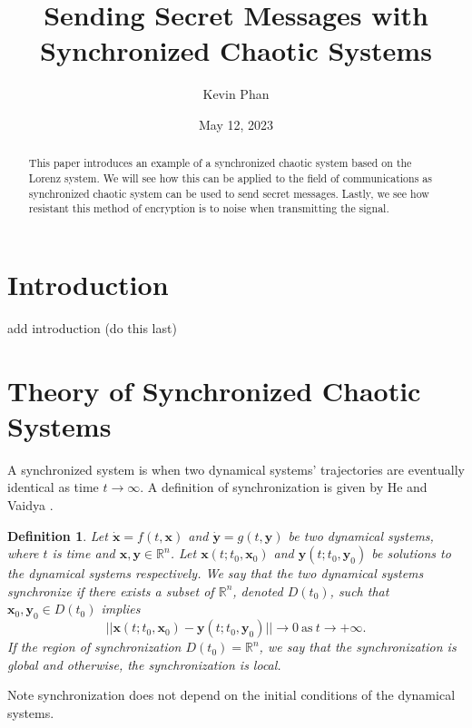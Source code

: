 \documentclass[12pt]{article}
\title{Sending Secret Messages with Synchronized Chaotic Systems}
\author{Kevin Phan}
\date{May 12, 2023}
\newtheorem{definition}{Definition}[section]
\begin{document}
    \maketitle

    \begin{abstract}
      This paper introduces an example of a synchronized chaotic system based on the Lorenz system. We will see how this can be applied to the field of communications as synchronized chaotic system can be used to send secret messages. Lastly, we see how resistant this method of encryption is to noise when transmitting the signal. 
    \end{abstract}

    \newpage

    \tableofcontents

    \newpage

    \section{Introduction}
      add introduction (do this last) \cite{cuomo1993}
    \section{Theory of Synchronized Chaotic Systems}
      A synchronized system is when two dynamical systems' trajectories are eventually identical as time $t \rightarrow \infty$. A definition of synchronization is given by He and Vaidya \cite{he_vaidya_1992}. 
      \begin{definition}
        Let $\dot{\mathbf{x}} = f(t,\mathbf{x})$ and $\dot{\mathbf{y}} = g(t,\mathbf{y})$ be two dynamical systems, where $t$ is time and $\mathbf{x},\mathbf{y} \in \mathbb{R}^n$. Let $\mathbf{x}(t;t_0,\mathbf{x}_0)$ and $\mathbf{y}(t;t_0,\mathbf{y}_0)$ be solutions to the dynamical systems respectively. We say that the two dynamical systems synchronize if there exists a subset of $\mathbb{R}^n$, denoted $D(t_0)$, such that $\mathbf{x}_0,\mathbf{y}_0 \in D(t_0)$ implies 
        \begin{equation*} 
          ||\mathbf{x}(t;t_0,\mathbf{x}_0) - \mathbf{y}(t;t_0,\mathbf{y}_0)|| \rightarrow 0 \ \text{as} \ t \rightarrow +\infty.
        \end{equation*}
        If the region of synchronization $D(t_0) = \mathbb{R}^n$, we say that the synchronization is global and otherwise, the synchronization is local. 
      \end{definition}
      Note synchronization does not depend on the initial conditions of the dynamical systems. 
      
\end{document}
